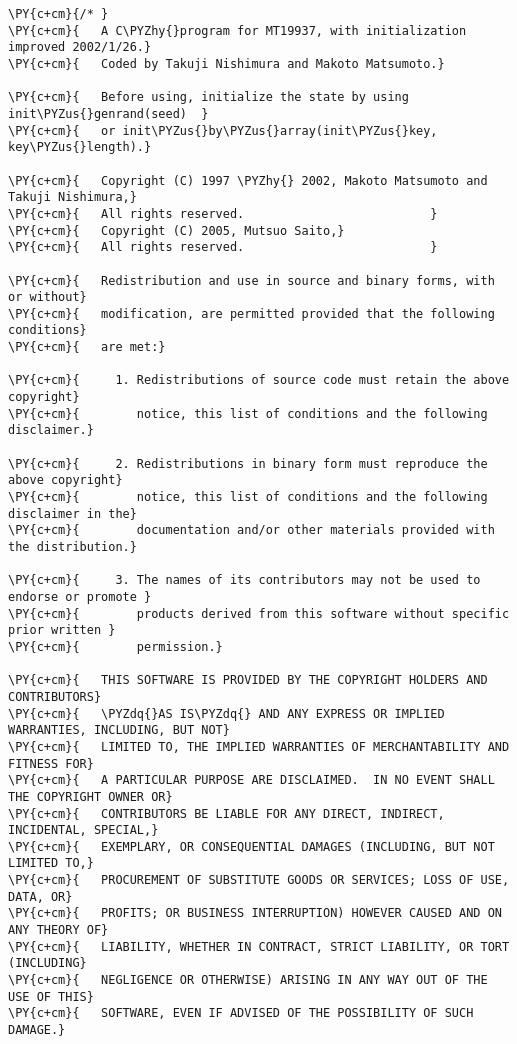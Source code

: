 \begin{Verbatim}[commandchars=\\\{\}]
\PY{c+cm}{/* }
\PY{c+cm}{   A C\PYZhy{}program for MT19937, with initialization improved 2002/1/26.}
\PY{c+cm}{   Coded by Takuji Nishimura and Makoto Matsumoto.}

\PY{c+cm}{   Before using, initialize the state by using init\PYZus{}genrand(seed)  }
\PY{c+cm}{   or init\PYZus{}by\PYZus{}array(init\PYZus{}key, key\PYZus{}length).}

\PY{c+cm}{   Copyright (C) 1997 \PYZhy{} 2002, Makoto Matsumoto and Takuji Nishimura,}
\PY{c+cm}{   All rights reserved.                          }
\PY{c+cm}{   Copyright (C) 2005, Mutsuo Saito,}
\PY{c+cm}{   All rights reserved.                          }

\PY{c+cm}{   Redistribution and use in source and binary forms, with or without}
\PY{c+cm}{   modification, are permitted provided that the following conditions}
\PY{c+cm}{   are met:}

\PY{c+cm}{     1. Redistributions of source code must retain the above copyright}
\PY{c+cm}{        notice, this list of conditions and the following disclaimer.}

\PY{c+cm}{     2. Redistributions in binary form must reproduce the above copyright}
\PY{c+cm}{        notice, this list of conditions and the following disclaimer in the}
\PY{c+cm}{        documentation and/or other materials provided with the distribution.}

\PY{c+cm}{     3. The names of its contributors may not be used to endorse or promote }
\PY{c+cm}{        products derived from this software without specific prior written }
\PY{c+cm}{        permission.}

\PY{c+cm}{   THIS SOFTWARE IS PROVIDED BY THE COPYRIGHT HOLDERS AND CONTRIBUTORS}
\PY{c+cm}{   \PYZdq{}AS IS\PYZdq{} AND ANY EXPRESS OR IMPLIED WARRANTIES, INCLUDING, BUT NOT}
\PY{c+cm}{   LIMITED TO, THE IMPLIED WARRANTIES OF MERCHANTABILITY AND FITNESS FOR}
\PY{c+cm}{   A PARTICULAR PURPOSE ARE DISCLAIMED.  IN NO EVENT SHALL THE COPYRIGHT OWNER OR}
\PY{c+cm}{   CONTRIBUTORS BE LIABLE FOR ANY DIRECT, INDIRECT, INCIDENTAL, SPECIAL,}
\PY{c+cm}{   EXEMPLARY, OR CONSEQUENTIAL DAMAGES (INCLUDING, BUT NOT LIMITED TO,}
\PY{c+cm}{   PROCUREMENT OF SUBSTITUTE GOODS OR SERVICES; LOSS OF USE, DATA, OR}
\PY{c+cm}{   PROFITS; OR BUSINESS INTERRUPTION) HOWEVER CAUSED AND ON ANY THEORY OF}
\PY{c+cm}{   LIABILITY, WHETHER IN CONTRACT, STRICT LIABILITY, OR TORT (INCLUDING}
\PY{c+cm}{   NEGLIGENCE OR OTHERWISE) ARISING IN ANY WAY OUT OF THE USE OF THIS}
\PY{c+cm}{   SOFTWARE, EVEN IF ADVISED OF THE POSSIBILITY OF SUCH DAMAGE.}



\end{Verbatim}
